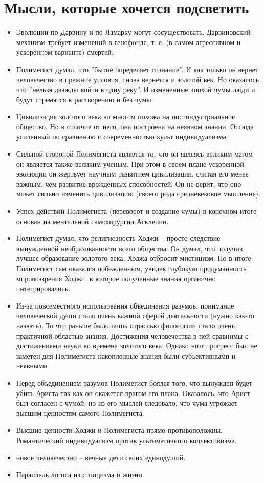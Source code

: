 \documentclass[12pt,a4paper]{article}
\begin{document}
\section*{Мысли, которые хочется подсветить}
\begin{itemize}
	\item Эволюции по Дарвину и по Ламарку могут сосуществовать. Дарвиновский механизм требует изменений в генофонде, т. е. (в самом агрессивном и ускоренном варианте) смертей.
	\item Полимегист думал, что ''бытие определяет сознание''. И как только он вернет человечество в прежние условия, снова вернется и золотой век. Но оказалось что ''нельзя дважды войти в одну реку''. И измененные эпохой чумы люди и будут стремятся к растворению и без чумы.
	\item Цивилизация золотого века во многом похожа на постиндустриальное общество. Но в отличие от него, она построена на неявном знании. Отсюда усиленный по сравнению с современностью культ индивидуализма.
	\item Сильной стороной Полимегиста является то, что он являясь великим магом он является также великим ученым. При этом в своем плане ускоренной эволюции он жертвует научным развитием цивилизации, считая его менее важным, чем развитие врожденных способностей. Он не верит, что оно может сильно изменить цивилизацию (своего рода средневековое мышление).
	\item Успех действий Полимегиста (переворот и создание чумы) в конечном итоге основан на ментальной самохирургии Асклепии.
	\item Полимегист думал, что религиозность Ходжи -- просто следствие вынужденной необразованности всего общества. Он думал, что получив лучшее образование золотого века, Ходжа отбросит мистицизм. Но в итоге Полимегист сам оказался побежденным, увидев глубокую продуманность мировоззрения Ходжи, в которое полученные знания органично интегрировались.
	\item Из-за повсеместного использования объединения разумов, понимание человеческой души стало очень важной сферой деятельности (нужно как-то назвать). То что раньше было лишь отраслью философии стало очень практичной областью знания. Достижения человечества в ней сравнимы с достижениями науки во времена золотого века. Однако этот прогресс был не заметен для Полимегиста накопленные знания были субъективными и неявными.
	\item Перед объединением разумов Полимегист боялся того, что вынужден будет убить Ариста так как он окажется врагом его плана. Оказалось, что Арист был согласен с чумой, но из его мыслей следовало, что чума угрожает высшим ценностям самого Полимегиста.
	\item Высшие ценности Ходжи и Полимегиста прямо противоположны. Романтический индивидуализм против ультимативного коллективизма.
	\item новое человечество -- вечные дети своих единодуший.
	\item[?] Параллель логоса из стоицизма и жизни.
\end{itemize}
\end{document}

